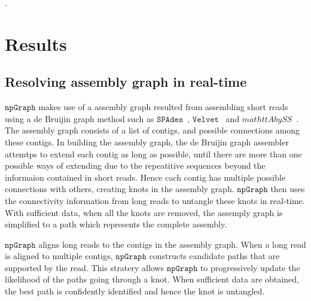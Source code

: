 \documentclass[10pt,twocolumn,twoside]{genpaper}
\newcommand{\npgraph}{$\mathtt{npGraph}$}
\newcommand{\spades}{$\mathtt{SPAdes}$}
\begin{document}
.
\section*{Results}
\subsection*{Resolving assembly graph in real-time}

\npgraph{} makes use of a assembly graph resulted from assembling short reads using a de Bruijin
graph method such as \spades{}~\cite{BankevichNA2012}, $\mathtt{Velvet}$~\cite{Zerbino2008}
and $mathtt{AbySS}$~\cite{Simpson2009}. The assembly graph consists of a list of contigs, and 
possible connections among these contigs. In building the assembly graph, the de Bruijin graph assembler attemtps to extend each contig as long as possible, until there are more than one possible
ways of extending due to the repeatitive sequences beyond the informaion contained in short reads. Hence cach contig has multiple possible connections with others, creating knots in the assembly graph. \npgraph{} then uses the connectivity information from long reads to untangle these knots in real-time. With sufficient data, when all the knots are removed, the assemply graph is simplified 
to a path which represents the complete assembly.

\npgraph{} aligns long reads to the contigs in the assembly graph. When a long read is aligned
to multiple contigs, \npgraph{} constructs candidate paths that are supported by the read. This 
stratery allows \npgraph{} to progressively update the likelihood of the paths going through a knot.
When sufficient data are obtained, the best path is confidently identified and hence the knot is untangled.


% 
\end{document}
